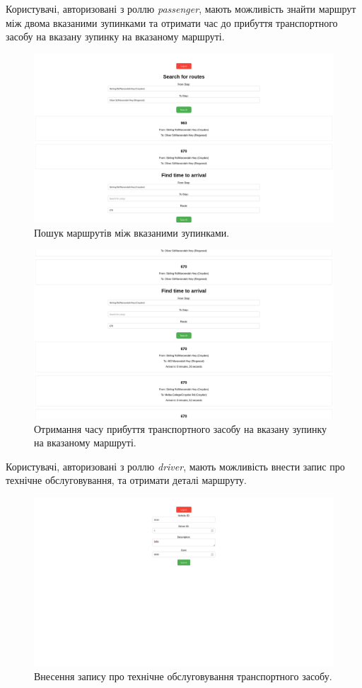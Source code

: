 \documentclass[oneside,14pt]{extarticle}
\begin{document}
Користувачі, авторизовані з роллю \textit{passenger}, мають можливість знайти маршрут між двома вказаними зупинками та отримати час до прибуття транспортного засобу на вказану зупинку на вказаному маршруті.

\begin{figure}[H]
\centering
\includegraphics[scale=0.25]{2}
\caption{Пошук маршрутів між вказаними зупинками.}
\end{figure}

\begin{figure}[H]
\centering
\includegraphics[scale=0.25]{3}
\caption{Отримання часу прибуття транспортного засобу на вказану зупинку на вказаному маршруті.}
\end{figure}

Користувачі, авторизовані з роллю \textit{driver}, мають можливість внести запис про технічне обслуговування, та отримати деталі маршруту.

\begin{figure}[H]
\centering
\includegraphics[scale=0.25]{4}
\caption{Внесення запису про технічне обслуговування транспортного засобу.}
\end{figure}
\end{document}

